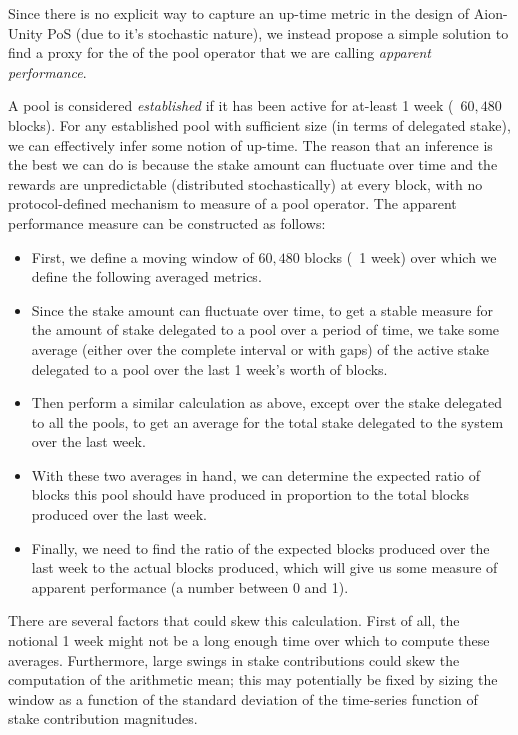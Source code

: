 Since there is no explicit way to capture an up-time metric in the design of Aion-Unity PoS (due to it's stochastic nature), we instead propose a simple solution to find a proxy for the  of the pool operator that we are calling \textit{apparent performance}. 

A pool is considered \textit{established} if it has been active for at-least 1 week (~$60,480$ blocks). For any established pool with sufficient size (in terms of delegated stake), we can effectively infer some notion of up-time. The reason that an inference is the best we can do is because the stake amount can fluctuate over time and the rewards are unpredictable (distributed stochastically) at every block, with no protocol-defined mechanism to measure  of a pool operator. The apparent performance measure can be constructed as follows: 
\begin{itemize}[label=--,nosep]
    \item First, we define a moving window of $60,480$ blocks (~1 week) over which we define the following averaged metrics.
    \item Since the stake amount can fluctuate over time, to get a stable measure for the amount of stake delegated to a pool over a period of time, we take some average (either over the complete interval or with gaps) of the active stake delegated to a pool over the last 1 week's worth of blocks.
    \item Then perform a similar calculation as above, except over the stake delegated to all the pools, to get an average for the total stake delegated to the system over the last week.
    \item With these two averages in hand, we can determine the expected ratio of blocks this pool should have produced in proportion to the total blocks produced over the last week. 
    \item Finally, we need to find the ratio of the expected blocks produced over the last week to the actual blocks produced, which will give us some measure of apparent performance (a number between 0 and 1).  
\end{itemize}

There are several factors that could skew this calculation. First of all, the notional 1 week might not be a long enough time over which to compute these averages. Furthermore, large swings in stake contributions could skew the computation of the arithmetic mean; this may potentially be fixed by sizing the window as a function of the standard deviation of the time-series function of stake contribution magnitudes. 

